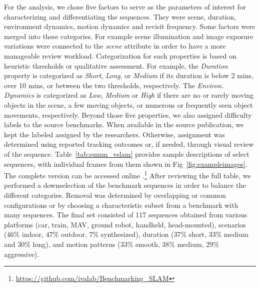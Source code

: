 For the analysis, we chose 
five
factors to serve as the
parameters of interest for characterizing and differentiating the
sequences.  They were scene, duration, environment dynamics, motion
dynamics and revisit frequency.  Some factors were merged into these
categories.  For example scene illumination and image exposure variations
were connected to the \textit{scene} attribute in order to have a more
manageable review workload.
Categorization for each properties is based on heuristic thresholds or
qualitative assessment. 
For example, the \textit{Duration} property is categorized as 
\textit{Short}, \textit{Long}, or \textit{Medium} if its duration
is below 2 mins, over 10 mins, or between the two thresholds, respectively. 
The \textit{Environ. Dynamics} is categorized as \textit{Low}, \textit{Medium} 
or \textit{High} if there are no or rarely moving objects in the scene, 
a few moving objects, or numerous or frequently seen object movements, 
respectively. 
Beyond those five properties, we also assigned difficulty labels to the
source benchmarks. When available in the source publication, we kept the
labeled assigned by the researchers. Otherwise, assignment was determined
using reported tracking outcomes or, if needed, through visual review of
the sequence. 
Table~\ref{tab:summ_vslam} provides sample descriptions of select
sequences, with individual frames from them shown in Fig~\ref{fig:exampleimages}. 
The complete version can be 
accessed online
.\!\!\footnote{\url{https://github.com/ivalab/Benchmarking_SLAM}} 
After reviewing the full table, we performed a downselection of the
benchmark sequences in order to balance the different categories.
Removal was determined by overlapping or common configurations or by
choosing a characteristic subset from a benchmark with many sequences.
The final set consisted of 
117
 sequences obtained from
various platforms (car, train, MAV, ground robot, handheld, head-mounted), 
scenarios (46\% indoor, 47\% outdoor, 7\% synthesized), 
duration (37\% short, 33\% medium and 30\% long), 
and motion patterns (33\% smooth, 38\% medium, 29\% aggressive). 


